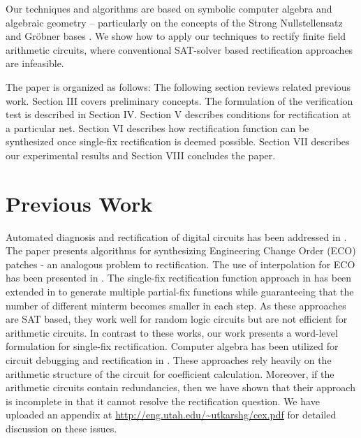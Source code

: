 Our techniques and algorithms are based on symbolic computer algebra
and algebraic geometry -- particularly on the concepts of the Strong
Nullstellensatz and Gr\"obner bases \cite{gb_book}. We show how to
apply our techniques to rectify finite field arithmetic circuits,
where conventional SAT-solver based rectification approaches are
infeasible.

The paper is organized as follows: The following section reviews
related previous work. Section III covers preliminary concepts. The
formulation of the verification test is described in Section
IV. Section V describes conditions for rectification at a particular
net. Section VI describes how rectification function can be
synthesized once single-fix rectification is deemed possible. Section
VII describes our experimental results and Section VIII concludes the
paper. 


\section{Previous Work}
Automated diagnosis and rectification of digital circuits
has been addressed in \cite{Madre:ICCAD89,Liaw:ICCAD90}. The paper \cite{Sadowska:DAC95} presents 
algorithms for synthesizing Engineering 
Change Order (ECO) patches - an analogous problem to rectification. 
The use of interpolation for ECO has been presented in \cite{Huang:DAC2011,roland:iccad10,Ling:tcad2011}.
The single-fix rectification function approach in \cite{roland:iccad10,Ling:tcad2011} 
has been extended in \cite{Huang:DAC2011} to generate multiple partial-fix functions while guaranteeing that 
the number of different minterm becomes smaller in each step. 
As these approaches are SAT based, they work well for random logic 
circuits but are not efficient for arithmetic circuits. In contrast to 
these works, our work presents a word-level formulation for single-fix rectification.
Computer algebra has been utilized for circuit debugging and rectification in
\cite{maciej:2015:2,farimah:2017:1,farimah:2016}. These approaches rely heavily on
the arithmetic structure of the circuit for coefficient calculation. Moreover,
if the arithmetic circuits contain redundancies, then we have shown
that their approach is incomplete in that it cannot resolve the
rectification question. We have uploaded an appendix at
 \url{http://eng.utah.edu/~utkarshg/cex.pdf} for detailed discussion on these
issues.


